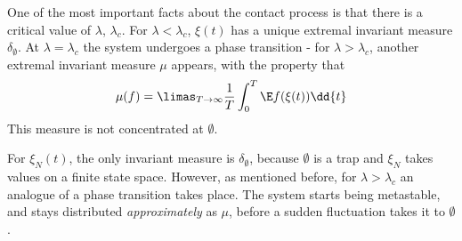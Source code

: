 \documentclass{scrartcl}
\begin{document}
One of the most important facts about the contact process is that there is a critical value of $\lambda$, $\lambda_{c}$. For $\lambda < \lambda_{c}$, $\xi(t)$ has a unique 
extremal invariant measure $\delta_{\emptyset}$. At $\lambda = \lambda_{c}$ the system undergoes a phase transition - for $\lambda > \lambda_{c}$, another extremal invariant 
measure $\mu$ appears, with the property that
\[ \mu(f) = \limas_{T \to \infty} \frac{1}{T} \int_{0}^{T} \E f(\xi(t)) \dd{t} \]
This measure is not concentrated at $\emptyset$.

For $\xi_{N}(t)$, the only invariant measure is $\delta_{\emptyset}$, because $\emptyset$ is a trap and $\xi_{N}$ takes values on a finite state space. 
However, as mentioned before, for $\lambda > \lambda_{c}$ an analogue of a phase transition takes place. The system starts being metastable, and stays distributed
\emph{approximately} as $\mu$, before a sudden fluctuation takes it to $\emptyset$.

%
%
%
%
%
\end{document}
